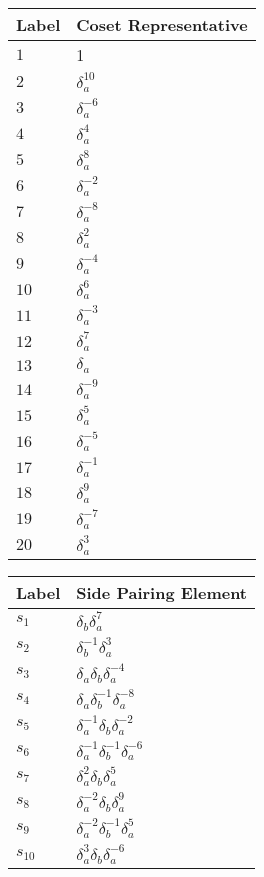 \documentclass{article}
\begin{document}

\begin{center}
\begin{tabular}{ll}
\toprule
Label & Coset Representative\\
\midrule
$1$ & 1 \\
$2$ & $\delta_a^{10}$ \\
$3$ & $\delta_a^{-6}$ \\
$4$ & $\delta_a^{4}$ \\
$5$ & $\delta_a^{8}$ \\
$6$ & $\delta_a^{-2}$ \\
$7$ & $\delta_a^{-8}$ \\
$8$ & $\delta_a^{2}$ \\
$9$ & $\delta_a^{-4}$ \\
$10$ & $\delta_a^{6}$ \\
$11$ & $\delta_a^{-3}$ \\
$12$ & $\delta_a^{7}$ \\
$13$ & $\delta_a^{}$ \\
$14$ & $\delta_a^{-9}$ \\
$15$ & $\delta_a^{5}$ \\
$16$ & $\delta_a^{-5}$ \\
$17$ & $\delta_a^{-1}$ \\
$18$ & $\delta_a^{9}$ \\
$19$ & $\delta_a^{-7}$ \\
$20$ & $\delta_a^{3}$ \\
\bottomrule
\end{tabular}
\hfill
\begin{tabular}{ll}
\toprule
Label & Side Pairing Element\\
\midrule
$s_{1}$ & $\delta_b^{}\delta_a^{7}$ \\
$s_{2}$ & $\delta_b^{-1}\delta_a^{3}$ \\
$s_{3}$ & $\delta_a^{}\delta_b^{}\delta_a^{-4}$ \\
$s_{4}$ & $\delta_a^{}\delta_b^{-1}\delta_a^{-8}$ \\
$s_{5}$ & $\delta_a^{-1}\delta_b^{}\delta_a^{-2}$ \\
$s_{6}$ & $\delta_a^{-1}\delta_b^{-1}\delta_a^{-6}$ \\
$s_{7}$ & $\delta_a^{2}\delta_b^{}\delta_a^{5}$ \\
$s_{8}$ & $\delta_a^{-2}\delta_b^{}\delta_a^{9}$ \\
$s_{9}$ & $\delta_a^{-2}\delta_b^{-1}\delta_a^{5}$ \\
$s_{10}$ & $\delta_a^{3}\delta_b^{}\delta_a^{-6}$ \\

\end{tabular}
\end{center}
\end{document}
